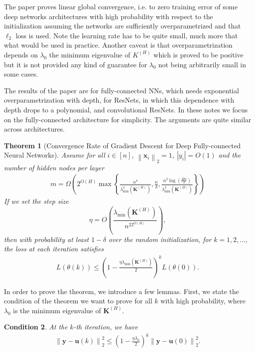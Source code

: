 \documentclass[11pt]{article}
\theoremstyle{plain}
\newtheorem{thm}{Theorem}[section]
\newtheorem{condition}[thm]{Condition}
\theoremstyle{definition}
\newcommand{\norm}[1]{\left\| #1 \right\|}
\newcommand{\abs}[1]{\left| #1 \right|}
\begin{document}
The paper proves linear global convergence, i.e. to zero training error of some deep networks architectures with high probability with respect to the initialization assuming the networks are sufficiently overparametrized and that $\ell_2$ loss is used. Note the learning rate has to be quite small, much more that what would be used in practice. Another caveat is that overparametrization depends on $\lambda_0$ the minimum eigenvalue of $K^(H)$ which is proved to be positive but it is not provided any kind of guarantee for $\lambda_0$ not being arbitrarily small in some cases. 

The results of the paper are for fully-connected NNs, which needs exponential overparametrization with depth, for ResNets, in which this dependence with depth drops to a polynomial, and convolutional ResNets. In these notes we focus on the fully-connected architecture for simplicity. The arguments are quite similar across architectures.

\begin{thm}[Convergence Rate of Gradient Descent for Deep Fully-connected Neural Networks]\label{thm:convergence}
Assume for all $i \in [n]$, $\norm{\mathbf{x}_i}_2 = 1$, $\abs{y_i} = O(1)$  and the number of hidden nodes per layer 
\begin{align*}
m=\Omega\left(2^{O(H)}\max\left\{
\frac{n^4}{\lambda_{\min}^4\left(\mathbf{K}^{(H)}\right)},\frac{n}{\delta}, \frac{n^2\log(\frac{Hn}{\delta})}{\lambda_{\min}^2\left(\mathbf{K}^{(H)}\right)}
\right\}\right)
\end{align*}
If we set the step size 
\[\eta = O\left(\frac{\lambda_{\min}\left(\mathbf{K}^{(H)}\right)}{n^22^{O(H)}}\right),\] 
then with probability at least $1-\delta$ over the random initialization, for $k=1,2,\ldots$, the loss at each iteration satisfies
\begin{align*}
L(\theta(k))\le \left(1-\frac{\eta \lambda _{\min}\left(\mathbf{K}^{(H)}\right)}{2}\right)^{k}L(\theta(0)).
\end{align*}
\end{thm}

In order to prove the theorem, we introduce a few lemmas. First, we state the condition of the theorem we want to prove for all $k$ with high probability, where $\lambda_0$ is the minimum eigenvalue of $\mathbf{K}^{(H)}$.

\begin{condition}\label{cond:linear_converge}
	At the $k$-th iteration, we have \begin{align*}
	\norm{\mathbf{y}-\mathbf{u}(k)}_2^2 \le (1-\frac{\eta \lambda_0}{2})^{k} \norm{\mathbf{y}-\mathbf{u}(0)}_2^2.
	\end{align*}
\end{condition}
\end{document}

